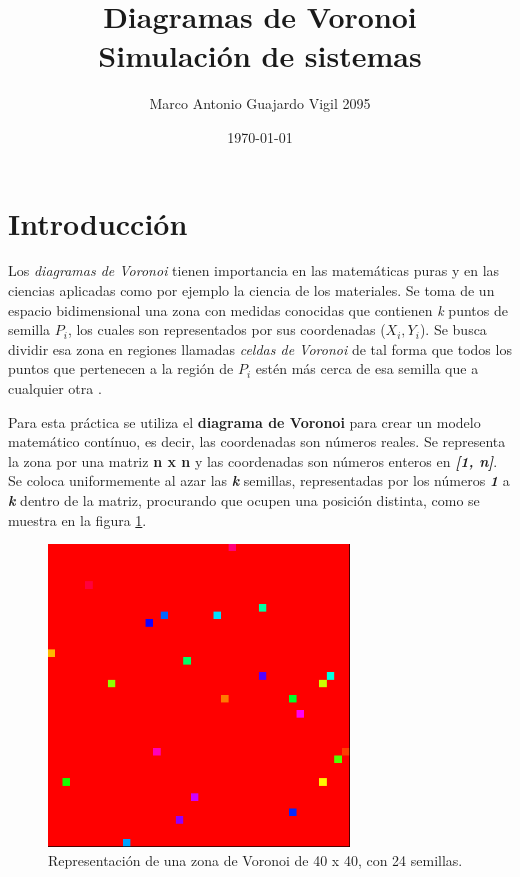 \documentclass{article}
\author{Marco Antonio Guajardo Vigil 2095}
\title{\textbf{Diagramas de Voronoi} \\ Simulaci\'on de sistemas}
\date{\today}
\begin{document}
\maketitle

\section{Introducci\'on}
Los \textit{diagramas de Voronoi} tienen importancia en las matem\'aticas puras y en las ciencias aplicadas como por ejemplo la ciencia de los materiales. Se toma de un espacio bidimensional una zona con medidas conocidas que contienen \textit{k} puntos de semilla $P_i$, los cuales son representados por sus coordenadas ($X_i, Y_i$). Se busca dividir esa zona en regiones llamadas \textit{celdas de Voronoi} de tal forma que todos los puntos que pertenecen a la regi\'on de $P_i$ est\'en m\'as cerca de esa semilla que a cualquier otra \cite{SatuP4}.

Para esta pr\'actica se utiliza el \textbf{diagrama de Voronoi} para crear un modelo matem\'atico cont\'inuo, es decir, las coordenadas son n\'umeros reales. Se representa la zona por una matriz \textbf{n x n} y las coordenadas son n\'umeros enteros en \textbf{\textit{[1, n]}}.
Se coloca uniformemente al azar las \textbf{\textit{k}} semillas, representadas por los n\'umeros \textbf{\textit{1}} a \textbf{\textit{k}} dentro de la matriz, procurando que ocupen una posici\'on distinta, como se muestra en la figura \ref{fig:Zona}.

\begin{figure}[h!]
\centering\includegraphics[width=80mm]{p4s.png}
\caption{Representaci\'on de una zona de Voronoi de 40 x 40, con 24 semillas.}
\label{fig:Zona}
\end{figure}
\end{document}
